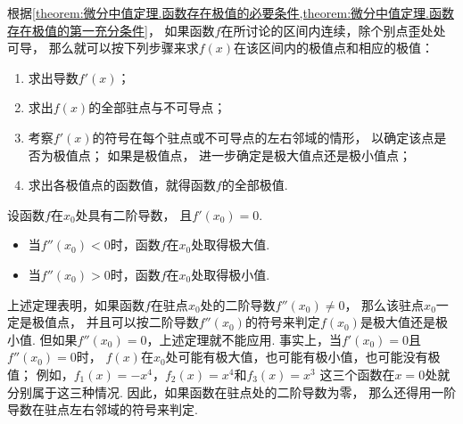 根据\cref{theorem:微分中值定理.函数存在极值的必要条件,theorem:微分中值定理.函数存在极值的第一充分条件}，
如果函数\(f\)在所讨论的区间内连续，除个别点歪处处可导，
那么就可以按下列步骤来求\(f(x)\)在该区间内的极值点和相应的极值：
\begin{algorithm}[确定函数的极值点和极值]
\hfill
\begin{enumerate}
	\item 求出导数\(f'(x)\)；

	\item 求出\(f(x)\)的全部驻点与不可导点；

	\item 考察\(f'(x)\)的符号在每个驻点或不可导点的左右邻域的情形，
	以确定该点是否为极值点；
	如果是极值点，
	进一步确定是极大值点还是极小值点；

	\item 求出各极值点的函数值，就得函数\(f\)的全部极值.
\end{enumerate}
\end{algorithm}

\begin{theorem}[函数存在极值的第二充分条件]\label{theorem:微分中值定理.函数存在极值的第二充分条件}
设函数\(f\)在\(x_0\)处具有二阶导数，
且\(f'(x_0)=0\).
\begin{itemize}
	\item 当\(f''(x_0)<0\)时，函数\(f\)在\(x_0\)处取得极大值.
	\item 当\(f''(x_0)>0\)时，函数\(f\)在\(x_0\)处取得极小值.
\end{itemize}
\end{theorem}
上述定理表明，如果函数\(f\)在驻点\(x_0\)处的二阶导数\(f''(x_0)\neq0\)，
那么该驻点\(x_0\)一定是极值点，
并且可以按二阶导数\(f''(x_0)\)的符号来判定\(f(x_0)\)是极大值还是极小值.
但如果\(f''(x_0)=0\)，上述定理就不能应用.
事实上，当\(f'(x_0)=0\)且\(f''(x_0)=0\)时，
\(f(x)\)在\(x_0\)处可能有极大值，也可能有极小值，也可能没有极值；
例如，\(f_1(x) = -x^4\)，\(f_2(x) = x^4\)和\(f_3(x) = x^3\)
这三个函数在\(x=0\)处就分别属于这三种情况.
因此，如果函数在驻点处的二阶导数为零，
那么还得用一阶导数在驻点左右邻域的符号来判定.

